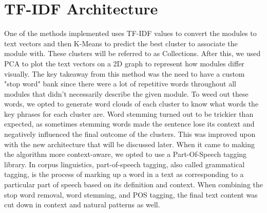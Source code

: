 \chapter{TF-IDF Architecture}
\label{ch:tfidfarchitecture}

One of the methods implemented uses TF-IDF values to convert the modules to text vectors and then K-Means to predict the best cluster to associate the module with. These clusters will be referred to as Collections. After this, we used PCA to plot the text vectors on a 2D graph to represent how modules differ visually. The key takeaway from this method was the need to have a custom "stop word" bank since there were a lot of repetitive words throughout all modules that didn't necessarily describe the given module. To weed out these words, we opted to generate word clouds of each cluster to know what words the key phrases for each cluster are. Word stemming turned out to be trickier than expected, as sometimes stemming words made the sentence lose its context and negatively influenced the final outcome of the clusters. This was improved upon with the new architecture that will be discussed later. When it came to making the algorithm more context-aware, we opted to use a Part-Of-Speech tagging library. In corpus linguistics, part-of-speech tagging, also called grammatical tagging, is the process of marking up a word in a text as corresponding to a particular part of speech based on its definition and context. When combining the stop word removal, word stemming, and POS tagging, the final text content was cut down in context and natural patterns as well.
